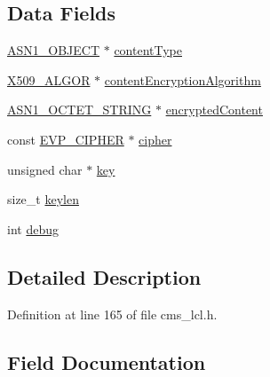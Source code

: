 \subsection*{Data Fields}
\begin{DoxyCompactItemize}
\item 
\hyperlink{crypto_2ossl__typ_8h_ae3fda0801e4c8e250087052bafb3ce2e}{A\+S\+N1\+\_\+\+O\+B\+J\+E\+CT} $\ast$ \hyperlink{struct_c_m_s___encrypted_content_info__st_af82a0c3993f8e0dc4a321794538ce00d}{content\+Type}
\item 
\hyperlink{crypto_2ossl__typ_8h_aa2b6185e6254f36f709cd6577fb5022e}{X509\+\_\+\+A\+L\+G\+OR} $\ast$ \hyperlink{struct_c_m_s___encrypted_content_info__st_ab74268bdd1cd37230cdbaa3d7acd8430}{content\+Encryption\+Algorithm}
\item 
\hyperlink{crypto_2ossl__typ_8h_afbd05e94e0f0430a2b729473efec88c1}{A\+S\+N1\+\_\+\+O\+C\+T\+E\+T\+\_\+\+S\+T\+R\+I\+NG} $\ast$ \hyperlink{struct_c_m_s___encrypted_content_info__st_a4e26cdc2903b846ddc22379cc4555bc6}{encrypted\+Content}
\item 
const \hyperlink{crypto_2ossl__typ_8h_a54a8663a8084d45c31f2786156b55405}{E\+V\+P\+\_\+\+C\+I\+P\+H\+ER} $\ast$ \hyperlink{struct_c_m_s___encrypted_content_info__st_a2a3fabda50b1a54bfb0ab0946771cc11}{cipher}
\item 
unsigned char $\ast$ \hyperlink{struct_c_m_s___encrypted_content_info__st_a1cb5ee363f3d6d0f548eb6e64d72a7c8}{key}
\item 
size\+\_\+t \hyperlink{struct_c_m_s___encrypted_content_info__st_af347fae5dae0b613448c54f3dea76ad2}{keylen}
\item 
int \hyperlink{struct_c_m_s___encrypted_content_info__st_ac3e1795766a80ec63b157951b4b9a7d4}{debug}
\end{DoxyCompactItemize}


\subsection{Detailed Description}


Definition at line 165 of file cms\+\_\+lcl.\+h.



\subsection{Field Documentation}
